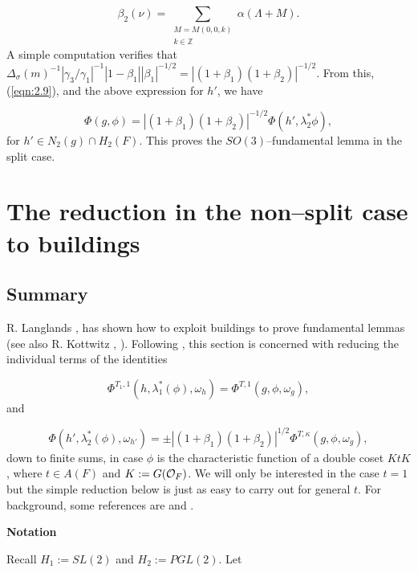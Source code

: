 \documentclass[12pt,letterpaper]{article}
\def\zzz{\mathbb{Z}}
\def\off{{\cal O}_F}
\begin{document}
\[
\beta_2 (\nu )=
\sum_{\substack{M=M(0,0,k)\\k\in \zzz }}
\alpha (\Lambda +M).
\]
A simple computation verifies that $\Delta_{\sigma }(m)^{-1}
|\gamma_3/\gamma_1|^{-1}|1-\beta_1||\beta_1|^{-1/2}
=|(1+\beta_1)(1+\beta_2)|^{-1/2}.$
From this, (\ref{eqn:2.9}), and the above expression for $h'$, we have

\begin{equation}
\label{eqn:2.13}
\Phi (g,\phi )=|(1+\beta_1)(1+\beta_2)|^{-1/2}
\Phi (h',\lambda_2^*\phi ),
\end{equation}
for $h'\in N_2(g)\cap H_2(F)$. This proves the $SO(3)$--fundamental
lemma in the split case.


\section{The reduction in the non--split case to buildings}
\label{sec:3}

\subsection{Summary}
\label{sec:3.1}

R. Langlands \cite{La1}, \cite{La3} has shown how to exploit buildings
to prove fundamental lemmas (see also R. Kottwitz \cite{Ko1}, \cite{Ko2}). 
Following \cite{La1}, this section is concerned 
with  reducing the individual terms of the identities

\begin{equation}
\label{eqn:3.1}
\Phi^{T_1,1}(h,\lambda_1^*(\phi ),\omega_h) = 
\Phi^{T,1}(g,\phi ,\omega_g),
\end{equation}
and

\begin{equation}
\label{eqn:3.2}
\Phi(h',\lambda_2^*(\phi ),\omega_{h'}) = 
\pm |(1+\beta_1)(1+\beta_2)|^{1/2}\Phi^{T,\kappa}(g,\phi ,\omega_g),
\end{equation}
down to finite sums, in case $\phi$ is the characteristic function of a
double coset $KtK$, where $t\in A(F)$ and $K:=G(\off )$. 
We will only be interested in the case $t=1$ but the simple reduction
below is just as easy to carry out for general $t$.
For background, some references are \cite{La3} and \cite{Ko1}.

{\bf Notation}

Recall $H_1:=SL(2)$ and $H_2:=PGL(2)$. Let
\end{document}
